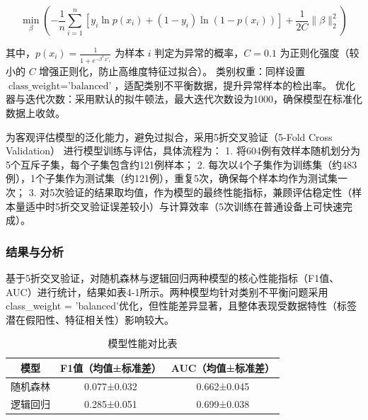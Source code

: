\documentclass[withoutpreface,bwprint]{cumcmthesis} %
\begin{document}
\begin{equation}
\min_{\beta} \left( -\frac{1}{n} \sum_{i=1}^n [y_i \ln p(x_i) + (1-y_i) \ln (1-p(x_i))] + \frac{1}{2C} \|\beta\|_2^2 \right)
\end{equation}


其中，$ p(x_i) = \frac{1}{1+e^{-\beta^T x'_i}} $ 为样本 $ i $ 判定为异常的概率，$ C = 0.1 $ 为正则化强度（较小的 $ C $ 增强正则化，防止高维度特征过拟合）。  
类别权重：同样设置 $ \text{class\_weight} = \text{'balanced'} $，适配类别不平衡数据，提升异常样本的检出率。  
优化器与迭代次数：采用默认的拟牛顿法，最大迭代次数设为1000，确保模型在标准化数据上收敛。

为客观评估模型的泛化能力，避免过拟合，采用5折交叉验证（5-Fold Cross Validation） 进行模型训练与评估，具体流程为：  
1. 将604例有效样本随机划分为5个互斥子集，每个子集包含约121例样本；  
2. 每次以4个子集作为训练集（约483例），1个子集作为测试集（约121例），重复5次，确保每个样本均作为测试集一次；  
3. 对5次验证的结果取均值，作为模型的最终性能指标，兼顾评估稳定性（样本量适中时5折交叉验证误差较小）与计算效率（5次训练在普通设备上可快速完成）。


\subsubsection{结果与分析}

基于5折交叉验证，对随机森林与逻辑回归两种模型的核心性能指标（F1值、AUC）进行统计，结果如表4-1所示。两种模型均针对类别不平衡问题采用class\_weight = 'balanced'优化，但性能差异显著，且整体表现受数据特性（标签潜在假阳性、特征相关性）影响较大。


\begin{table}[H]
    \centering  %
    \caption{模型性能对比表}  %
    \label{tab:模型性能对比表}  %
    \begin{threeparttable}
        \begin{tabularx}{0.75\textwidth}{c c c}
            \toprule[1.5pt]
            \textbf{模型} & \textbf{F1值（均值±标准差）} & \textbf{AUC（均值±标准差）} \\ 
            \midrule[1pt]
            随机森林 & 0.077±0.032 & 0.662±0.045 \\
            逻辑回归 & 0.285±0.051 & 0.699±0.038 \\

            \bottomrule[1.5pt]
        
        \end{tabularx}
    \end{threeparttable}
\end{table}
\end{document}
